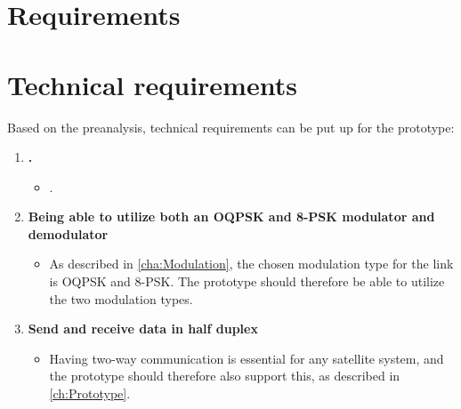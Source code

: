 \chapter{Requirements}
\chapter{Technical requirements}
\label{ch:technicalRequirements}
Based on the preanalysis, technical requirements can be put up for the prototype:
\begin{enumerate}[label=\textbf{\arabic*})]

\item \textbf{.}
\begin{itemize}
\item[]  .
\end{itemize}

\item \textbf{Being able to utilize both an OQPSK and 8-PSK modulator and demodulator}
\begin{itemize}
\item[] As described in \autoref{cha:Modulation}, the chosen modulation type for the link is OQPSK and 8-PSK. The prototype should therefore be able to utilize the two modulation types.
\end{itemize}

\item \textbf{Send and receive data in half duplex}
\begin{itemize}
\item[] Having two-way communication is essential for any satellite system, and the prototype should therefore also support this, as described in \autoref{ch:Prototype}.
\end{itemize}


\end{enumerate}

